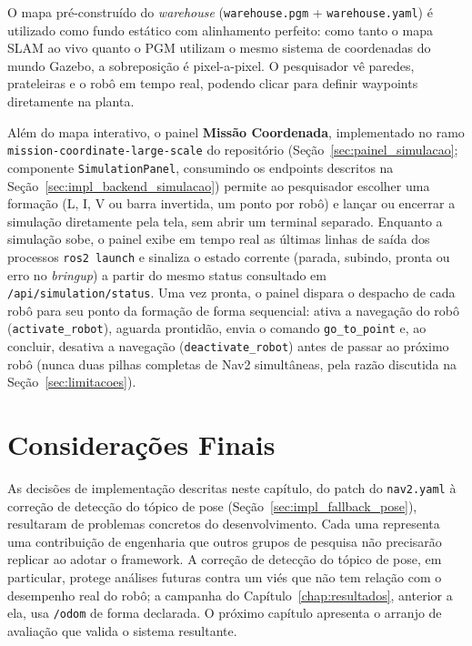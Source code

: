 O mapa pré-construído do \textit{warehouse} (\texttt{warehouse.pgm} +
\texttt{warehouse.yaml}) é utilizado como fundo estático com alinhamento perfeito:
como tanto o mapa SLAM ao vivo quanto o PGM utilizam o mesmo sistema de coordenadas
do mundo Gazebo, a sobreposição é pixel-a-pixel. O pesquisador vê paredes, prateleiras
e o robô em tempo real, podendo clicar para definir waypoints diretamente na planta.

Além do mapa interativo, o painel \textbf{Missão Coordenada}, implementado no
ramo \texttt{mission-\allowbreak coordinate-\allowbreak large-\allowbreak scale}
do repositório (Seção~\ref{sec:painel_simulacao}; componente
\texttt{SimulationPanel}, consumindo os endpoints descritos na
Seção~\ref{sec:impl_backend_simulacao}) permite ao pesquisador escolher
uma formação (L, I, V ou barra invertida, um ponto por robô) e lançar ou
encerrar a simulação diretamente pela tela, sem abrir um terminal
separado. Enquanto a simulação sobe, o painel exibe em tempo real as
últimas linhas de saída dos processos \texttt{ros2 launch} e sinaliza o
estado corrente (parada, subindo, pronta ou erro no \textit{bringup}) a
partir do mesmo status consultado em \texttt{/\allowbreak api/\allowbreak simulation/\allowbreak status}.
Uma vez pronta, o painel dispara o despacho de cada robô para seu ponto da
formação de forma sequencial: ativa a navegação do robô
(\texttt{activate\_\allowbreak robot}), aguarda prontidão, envia o comando
\texttt{go\_\allowbreak to\_\allowbreak point} e, ao concluir, desativa a navegação
(\texttt{deactivate\_\allowbreak robot}) antes de passar ao próximo robô (nunca
duas pilhas completas de Nav2 simultâneas, pela razão discutida na
Seção~\ref{sec:limitacoes}).

\section{Considerações Finais}
\label{sec:impl_conclusao}

As decisões de implementação descritas neste capítulo, do patch do
\texttt{nav2.yaml} à correção de detecção do tópico de pose
(Seção~\ref{sec:impl_fallback_pose}), resultaram de problemas concretos do
desenvolvimento. Cada uma representa uma contribuição de
engenharia que outros grupos de pesquisa não precisarão replicar ao adotar
o framework. A correção de detecção do tópico de pose, em
particular, protege análises futuras contra um viés que não tem relação com o
desempenho real do robô; a campanha do Capítulo~\ref{chap:resultados}, anterior
a ela, usa \texttt{/\allowbreak odom} de forma declarada. O próximo capítulo apresenta
o arranjo de avaliação que valida o sistema resultante.
